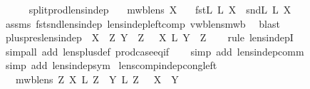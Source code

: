 \begin{isabellebody}
\endisatagproof
{\isafoldproof}%
%
\isadelimproof
\isanewline
%
\endisadelimproof
\ \ \ \ \isanewline
{}\isamarkupfalse%
\ split{\isacharunderscore}prod{\isacharunderscore}lens{\isacharunderscore}indep{\isacharcolon}\isanewline
\ \ \ {\isachardoublequoteopen}mwb{\isacharunderscore}lens\ X{\isachardoublequoteclose}\isanewline
\ \ \ {\isachardoublequoteopen}{\isacharparenleft}fst\isactrlsub L\ {\isacharsemicolon}\isactrlsub L\ X{\isacharparenright}\ {\isasymbowtie}\ {\isacharparenleft}snd\isactrlsub L\ {\isacharsemicolon}\isactrlsub L\ X{\isacharparenright}{\isachardoublequoteclose}\isanewline
%
\isadelimproof
\ \ %
\endisadelimproof
%
\isatagproof
{}\isamarkupfalse%
\ assms\ fst{\isacharunderscore}snd{\isacharunderscore}lens{\isacharunderscore}indep\ lens{\isacharunderscore}indep{\isacharunderscore}left{\isacharunderscore}comp\ vwb{\isacharunderscore}lens{\isacharunderscore}mwb\ \isamarkupfalse%
\ blast%
\endisatagproof
{\isafoldproof}%
%
\isadelimproof
\isanewline
%
\endisadelimproof
\isanewline
{}\isamarkupfalse%
\ plus{\isacharunderscore}pres{\isacharunderscore}lens{\isacharunderscore}indep{\isacharcolon}\ {\isachardoublequoteopen}{\isasymlbrakk}\ X\ {\isasymbowtie}\ Z{\isacharsemicolon}\ Y\ {\isasymbowtie}\ Z\ {\isasymrbrakk}\ {\isasymLongrightarrow}\ {\isacharparenleft}X\ {\isacharplus}\isactrlsub L\ Y{\isacharparenright}\ {\isasymbowtie}\ Z{\isachardoublequoteclose}\isanewline
%
\isadelimproof
\ \ %
\endisadelimproof
%
\isatagproof
{}\isamarkupfalse%
\ {\isacharparenleft}rule\ lens{\isacharunderscore}indepI{\isacharparenright}\isanewline
\ \ \isamarkupfalse%
\ {\isacharparenleft}simp{\isacharunderscore}all\ add{\isacharcolon}\ lens{\isacharunderscore}plus{\isacharunderscore}def\ prod{\isachardot}case{\isacharunderscore}eq{\isacharunderscore}if{\isacharparenright}\isanewline
\ \ \isamarkupfalse%
\ {\isacharparenleft}simp\ add{\isacharcolon}\ lens{\isacharunderscore}indep{\isacharunderscore}comm{\isacharparenright}\isanewline
\ \ \isamarkupfalse%
\ {\isacharparenleft}simp\ add{\isacharcolon}\ lens{\isacharunderscore}indep{\isacharunderscore}sym{\isacharparenright}\isanewline
{}\isamarkupfalse%
%
\endisatagproof
{\isafoldproof}%
%
\isadelimproof
\isanewline
%
\endisadelimproof
\isanewline
{}\isamarkupfalse%
\ lens{\isacharunderscore}comp{\isacharunderscore}indep{\isacharunderscore}cong{\isacharunderscore}left{\isacharcolon}\isanewline
\ \ {\isachardoublequoteopen}{\isasymlbrakk}\ mwb{\isacharunderscore}lens\ Z{\isacharsemicolon}\ X\ {\isacharsemicolon}\isactrlsub L\ Z\ {\isasymbowtie}\ Y\ {\isacharsemicolon}\isactrlsub L\ Z\ {\isasymrbrakk}\ {\isasymLongrightarrow}\ X\ {\isasymbowtie}\ Y{\isachardoublequoteclose}\isanewline

\end{isabellebody}
